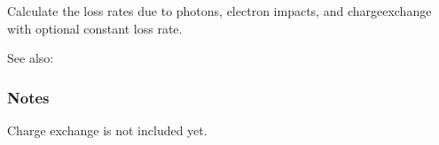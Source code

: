\documentclass[letterpaper,10pt,english]{sphinxmanual}
\begin{document}
\begin{fulllineitems}
\label{\detokenize{nexoclom2/nexoclom2.atomicdata.lossrate:nexoclom2.atomicdata.lossrate.lossrate}}
\pysigstartsignatures
\pysiglinewithargsret
{}
{\sphinxparamcomma {}}
{}
\pysigstopsignatures
\sphinxAtStartPar
Calculate the loss rates due to photons, electron impacts, and charge\sphinxhyphen{}exchange
with optional constant loss rate.
\begin{quote}\begin{description}
\begin{description}
\end{description}

\begin{description}
\end{description}

\end{description}\end{quote}


\begin{sphinxseealso}{See also:}
\begin{description}
\end{description}


\end{sphinxseealso}

\subsubsection*{Notes}

\sphinxAtStartPar
Charge exchange is not included yet.

\end{fulllineitems}


\sphinxstepscope
\end{document}
